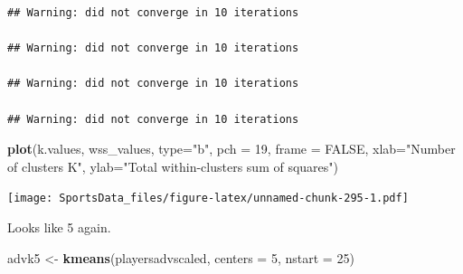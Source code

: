 \documentclass[]{book}
\newenvironment{Shaded}{\begin{snugshade}}{\end{snugshade}}
\newcommand{\CommentTok}[1]{\textcolor[rgb]{0.56,0.35,0.01}{\textit{#1}}}
\newcommand{\ControlFlowTok}[1]{\textcolor[rgb]{0.13,0.29,0.53}{\textbf{#1}}}
\newcommand{\DataTypeTok}[1]{\textcolor[rgb]{0.13,0.29,0.53}{#1}}
\newcommand{\DecValTok}[1]{\textcolor[rgb]{0.00,0.00,0.81}{#1}}
\newcommand{\KeywordTok}[1]{\textcolor[rgb]{0.13,0.29,0.53}{\textbf{#1}}}
\newcommand{\NormalTok}[1]{#1}
\newcommand{\OperatorTok}[1]{\textcolor[rgb]{0.81,0.36,0.00}{\textbf{#1}}}
\newcommand{\OtherTok}[1]{\textcolor[rgb]{0.56,0.35,0.01}{#1}}
\newcommand{\StringTok}[1]{\textcolor[rgb]{0.31,0.60,0.02}{#1}}
\begin{document}
\begin{Shaded}
\end{Shaded}

\begin{verbatim}
## Warning: did not converge in 10 iterations

## Warning: did not converge in 10 iterations

## Warning: did not converge in 10 iterations

## Warning: did not converge in 10 iterations
\end{verbatim}

\begin{Shaded}
\begin{Highlighting}[]
\KeywordTok{plot}\NormalTok{(k.values, wss_values,}
       \DataTypeTok{type=}\StringTok{"b"}\NormalTok{, }\DataTypeTok{pch =} \DecValTok{19}\NormalTok{, }\DataTypeTok{frame =} \OtherTok{FALSE}\NormalTok{, }
       \DataTypeTok{xlab=}\StringTok{"Number of clusters K"}\NormalTok{,}
       \DataTypeTok{ylab=}\StringTok{"Total within-clusters sum of squares"}\NormalTok{)}
\end{Highlighting}
\end{Shaded}

\texttt{[image: SportsData\_files/figure-latex/unnamed-chunk-295-1.pdf]}

Looks like 5 again.

\begin{Shaded}
\begin{Highlighting}[]
\NormalTok{advk5 <-}\StringTok{ }\KeywordTok{kmeans}\NormalTok{(playersadvscaled, }\DataTypeTok{centers =} \DecValTok{5}\NormalTok{, }\DataTypeTok{nstart =} \DecValTok{25}\NormalTok{)}
\end{Highlighting}
\end{Shaded}
\end{document}
